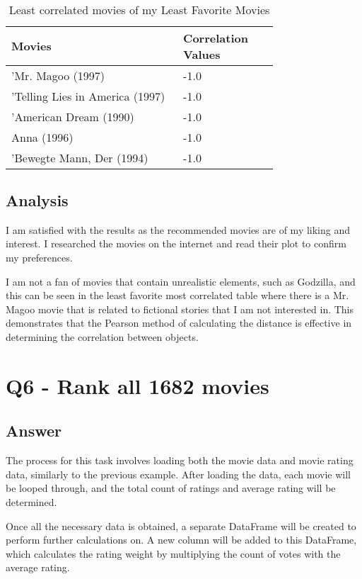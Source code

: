 \documentclass[12pt]{article}
\begin{document}
\\
\begin{table}[h]
\centering
\caption{Least correlated movies of my Least Favorite Movies}
\label{tbl:simple}
\begin{tabular}{p{0.50\linewidth}p{0.25\linewidth}}
\hline
\textbf{Movies} & \textbf{Correlation Values} \\ \hline \hline
'Mr. Magoo (1997) & -1.0 \\ \hline
'Telling Lies in America (1997)  & -1.0 \\ \hline
'American Dream (1990) & -1.0 \\ \hline
Anna (1996) & -1.0 \\ \hline
'Bewegte Mann, Der (1994) & -1.0 \\ \hline
\hline
\end{tabular}
\end{table}
\subsection*{Analysis}

I am satisfied with the results as the recommended movies are of my liking and interest. I researched the movies on the internet and read their plot to confirm my preferences.

I am not a fan of movies that contain unrealistic elements, such as Godzilla, and this can be seen in the least favorite most correlated table where there is a Mr. Magoo movie that is related to fictional stories that I am not interested in. This demonstrates that the Pearson method of calculating the distance is effective in determining the correlation between objects.

 
\clearpage
\section*{Q6 - Rank all 1682 movies}

\subsection*{Answer}
The process for this task involves loading both the movie data and movie rating data, similarly to the previous example. After loading the data, each movie will be looped through, and the total count of ratings and average rating will be determined.

Once all the necessary data is obtained, a separate DataFrame will be created to perform further calculations on. A new column will be added to this DataFrame, which calculates the rating weight by multiplying the count of votes with the average rating. 
\end{document}
